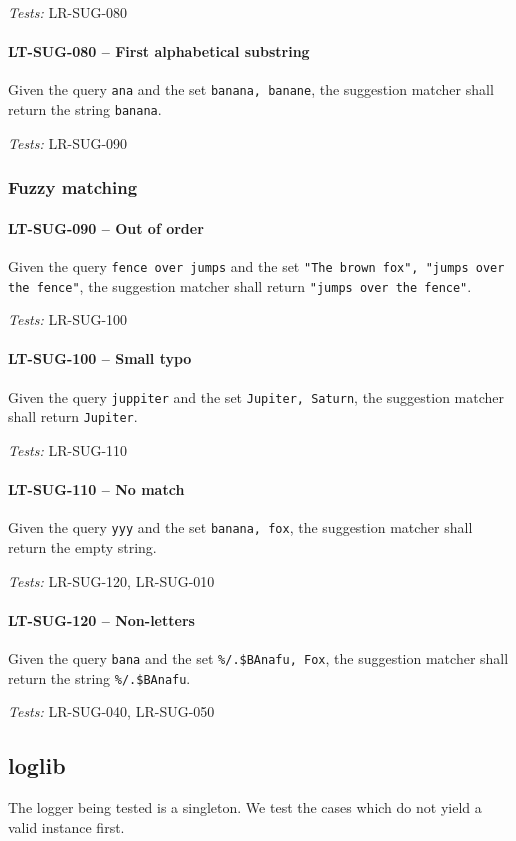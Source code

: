 \textit{Tests: } LR-SUG-080

\paragraph{LT-SUG-080 -- First alphabetical substring}
Given the query \lstinline{ana} and the set \lstinline{banana, banane},
the suggestion matcher shall return the string \lstinline{banana}.

\textit{Tests: } LR-SUG-090

\subsubsection{Fuzzy matching}
\paragraph{LT-SUG-090 -- Out of order}
Given the query \lstinline{fence over jumps} and the set
\lstinline{"The brown fox", "jumps over the fence"}, the suggestion
matcher shall return \lstinline{"jumps over the fence"}.

\textit{Tests: } LR-SUG-100

\paragraph{LT-SUG-100 -- Small typo}
Given the query \lstinline{juppiter} and the set
\lstinline{Jupiter, Saturn}, the suggestion matcher shall return
\lstinline{Jupiter}.

\textit{Tests: } LR-SUG-110

\paragraph{LT-SUG-110 -- No match}
Given the query \lstinline{yyy} and the set
\lstinline{banana, fox}, the suggestion matcher shall return the
empty string.

\textit{Tests: } LR-SUG-120, LR-SUG-010

\paragraph{LT-SUG-120 -- Non-letters}
Given the query \lstinline{bana} and the set
\lstinline{%/.$BAnafu, Fox}, the suggestion matcher shall return
the string \lstinline{%/.$BAnafu}.

\textit{Tests: } LR-SUG-040, LR-SUG-050

\subsection{log\textunderscore lib}
The logger being tested is a singleton. We test the cases which do not
yield a valid instance first.

